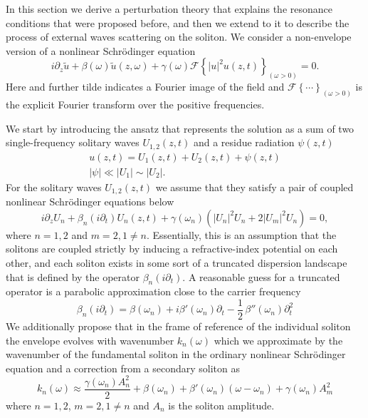 \documentclass[aps, prl, twocolumn, superscriptaddress, final]{revtex4}
\newcommand{\abs}[1]{\left| #1 \right|}
\begin{document}
In this section we derive a perturbation theory that explains the resonance conditions that were proposed before, and then we extend to it to describe the process of external waves scattering on the soliton. We consider a non-envelope version of a nonlinear Schr\"odinger equation~\cite{amiranashvili2010hamiltonian}
\begin{equation}
  \label{eq:GNLSE}
  i \partial_{z} \tilde u
    + \beta(\omega) \tilde u(z, \omega)
    + \gamma(\omega) \mathcal{F} \left\{
      \abs{u}^{2} u(z, t)
    \right\}_{(\omega > 0)} = 0.
\end{equation}
Here and further tilde indicates a Fourier image of the field and $\mathcal{F}\left\{ \cdots \right\}_{(\omega > 0)}$ is the explicit Fourier transform over the positive frequencies.

\begin{widetext}

\noindent We start by introducing the ansatz that represents the solution as a sum of two single-frequency solitary waves $U_{1, 2}(z, t)$ and a residue radiation $\psi(z, t)$
\begin{gather}
  \label{eq:PerturbationAnsatz}
  u(z, t) = U_{1}(z, t) + U_{2}(z, t) + \psi(z, t) \\
  \abs{\psi} \ll \abs{U_{1}} \sim \abs{U_{2}}. \nonumber
\end{gather}
For the solitary waves $U_{1, 2}(z, t)$ we assume that they satisfy a pair of coupled nonlinear Schr\"odinger equations below
\begin{equation}
  \label{eq:CoupledSolitons}
  i \partial_{z} U_{n}
    + \beta_{n}(i \partial_{t}) U_{n}(z, t)
    + \gamma(\omega_{n}) \left(
      \abs{U_{n}}^{2} U_{n} + 2 \abs{U_{m}}^{2} U_{n}
    \right) = 0,
\end{equation}
where $n = 1, 2$ and $m = 2, 1 \ne n$. Essentially, this is an assumption that the solitons are coupled strictly by inducing a refractive-index potential on each other, and each soliton exists in some sort of a truncated dispersion landscape that is defined by the operator $\beta_{n}(i \partial_{t})$. A reasonable guess for a truncated operator is a parabolic approximation close to the carrier frequency
\begin{equation}
  \label{eq:TruncatedDispersionOperator}
  \beta_{n}(i \partial_{t}) =
    \beta(\omega_{n}) +
    i \beta'(\omega_{n}) \partial_{t} -
    \frac{1}{2} \, \beta''(\omega_{n}) \partial_{t}^{2}
\end{equation}
We additionally propose that in the frame of reference of the individual soliton the envelope evolves with wavenumber $k_{n}(\omega)$ which we approximate by the wavenumber of the fundamental soliton in the ordinary nonlinear Schr\"odinger equation and a correction from a secondary soliton as
\begin{equation}
  \label{eq:SolitonWavenumber}
  k_{n}(\omega)
    \approx \frac{\gamma(\omega_{n}) A_{n}^{2}}{2}
    + \beta(\omega_{n}) + \beta'(\omega_{n}) (\omega - \omega_{n})
    + \gamma(\omega_{n}) A_{m}^{2}
\end{equation}
where $n = 1, 2$, $m = 2, 1 \ne n$ and $A_{n}$ is the soliton amplitude.


\end{widetext}
\end{document}
